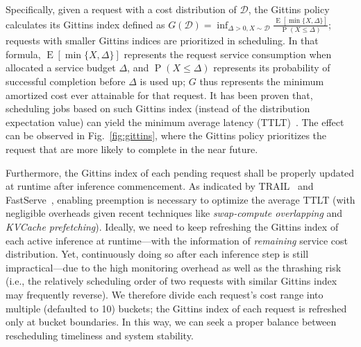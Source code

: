 Specifically, given a request with a cost distribution of $\mathcal{D}$, the Gittins policy calculates its Gittins index defined as $G(\mathcal{D})=\operatorname*{inf}_{\Delta>0,X\sim\mathcal{D}}{\frac{\operatorname{E}[\operatorname*{min}\{X,\Delta\}]}{\operatorname*{P}(X\leq\Delta)}}$; requests with smaller Gittins indices are prioritized in scheduling. %
In that formula, $\operatorname{E}[\operatorname*{min}\{X,\Delta\}]$ represents the request service consumption when allocated a service budget $\Delta$, and $\operatorname*{P}(X\leq\Delta)$ represents its probability of successful completion before $\Delta$ is used up; $G$ thus represents the minimum amortized cost ever attainable for that request. 
It has been proven that, scheduling jobs based on such Gittins index (instead of the distribution expectation value) can yield the minimum average latency (TTLT)~\cite{gittins1989multiprocessor}. {The effect can be observed in Fig.~\ref{fig:gittins}, where the Gittins policy prioritizes the request that are more likely to complete in the near future.}

Furthermore, the Gittins index of each pending request shall be properly updated at runtime after inference commencement.
As indicated by TRAIL~\cite{shahout2024don} and FastServe~\cite{wu2023fast}, enabling preemption is necessary to optimize the average TTLT (with negligible overheads given recent techniques like \emph{swap-compute overlapping} and \emph{KVCache prefetching}).  
Ideally, we need to keep refreshing the Gittins index of each active inference at runtime---with the information of \emph{remaining} service cost distribution.
Yet, continuously doing so after each inference step is still impractical---due to the high monitoring overhead as well as the thrashing risk (i.e., the relatively scheduling order of two requests with similar Gittins index may frequently reverse).
We therefore divide each request's cost range into multiple (defaulted to 10) buckets; the Gittins index of each request is refreshed only at bucket boundaries. 
In this way, we can seek a proper balance between rescheduling timeliness and system stability. 



